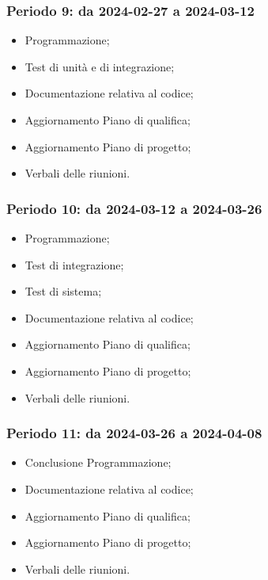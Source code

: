 \documentclass[10pt, a4paper]{article}
\begin{document}
\subsubsection{Periodo 9: da 2024-02-27 a 2024-03-12}
%
\begin{itemize}
    \item Programmazione;
    \item Test di unità e di integrazione;
    \item Documentazione relativa al codice;
    \item Aggiornamento Piano di qualifica;
    \item Aggiornamento Piano di progetto;
    \item Verbali delle riunioni.
\end{itemize}

\subsubsection{Periodo 10: da 2024-03-12 a 2024-03-26}
%
\begin{itemize}
    \item Programmazione;
    \item Test di integrazione;
    \item Test di sistema;
    \item Documentazione relativa al codice;
    \item Aggiornamento Piano di qualifica;
    \item Aggiornamento Piano di progetto;
    \item Verbali delle riunioni.
\end{itemize}
\subsubsection{Periodo 11: da 2024-03-26 a 2024-04-08}
%
\begin{itemize}
    \item Conclusione Programmazione;
    \item Documentazione relativa al codice;
    \item Aggiornamento Piano di qualifica;
    \item Aggiornamento Piano di progetto;
    \item Verbali delle riunioni.
\end{itemize}


\newpage
\end{document}
